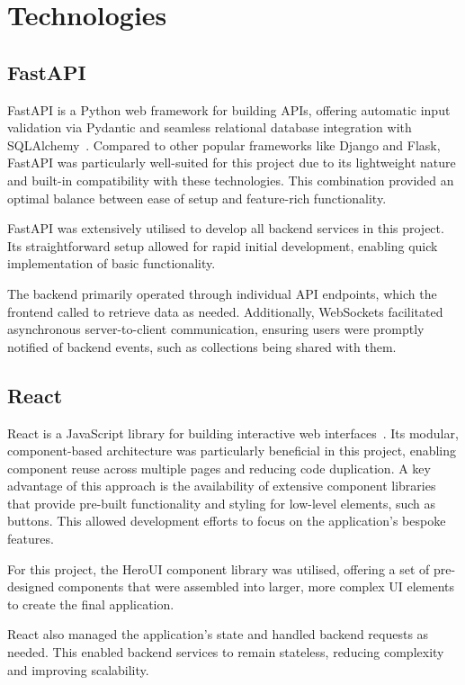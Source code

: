 \section{Technologies}
\subsection{FastAPI}
FastAPI is a Python web framework for building APIs, offering automatic input validation via Pydantic and seamless relational database integration with SQLAlchemy~\cite{FastAPI}. Compared to other popular frameworks like Django and Flask, FastAPI was particularly well-suited for this project due to its lightweight nature and built-in compatibility with these technologies. This combination provided an optimal balance between ease of setup and feature-rich functionality.

FastAPI was extensively utilised to develop all backend services in this project. Its straightforward setup allowed for rapid initial development, enabling quick implementation of basic functionality.

The backend primarily operated through individual API endpoints, which the frontend called to retrieve data as needed. Additionally, WebSockets facilitated asynchronous server-to-client communication, ensuring users were promptly notified of backend events, such as collections being shared with them.

\subsection{React}
React is a JavaScript library for building interactive web interfaces~\cite{React}. Its modular, component-based architecture was particularly beneficial in this project, enabling component reuse across multiple pages and reducing code duplication. A key advantage of this approach is the availability of extensive component libraries that provide pre-built functionality and styling for low-level elements, such as buttons. This allowed development efforts to focus on the application's bespoke features.

For this project, the HeroUI component library was utilised, offering a set of pre-designed components that were assembled into larger, more complex UI elements to create the final application.

React also managed the application's state and handled backend requests as needed. This enabled backend services to remain stateless, reducing complexity and improving scalability.

